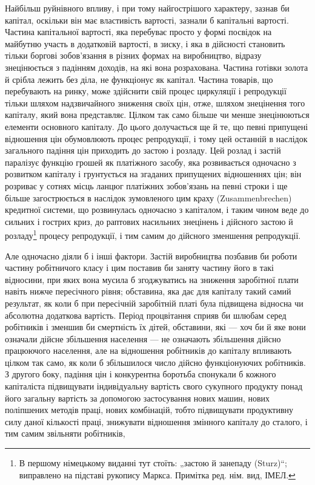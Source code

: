 Найбільш руйнівного впливу, і при тому найгострішого
характеру, зазнав би капітал, оскільки він має властивість
вартості, зазнали б капітальні вартості. Частина капітальної
вартості, яка перебуває просто у формі посвідок на майбутню
участь в додатковій вартості, в зиску, і яка в дійсності становить
тільки боргові зобов’язання в різних формах на виробництво,
відразу знецінюється з падінням доходів, на які вона розрахована.
Частина готівки золота й срібла лежить без діла, не функціонує
як капітал. Частина товарів, що перебувають на ринку, може
здійснити свій процес циркуляції і репродукції тільки шляхом
надзвичайного зниження своїх цін, отже, шляхом знецінення
того капіталу, який вона представляє. Цілком так само більше
чи менше знецінюються елементи основного капіталу. До цього
долучається ще й те, що певні припущені відношення цін
обумовлюють процес репродукції, і тому цей останній в наслідок
загального падіння цін приходить до застою і розладу. Цей
розлад і застій паралізує функцію грошей як платіжного засобу,
яка розвивається одночасно з розвитком капіталу і грунтується
на згаданих припущених відношеннях цін; він розриває у сотнях
місць ланцюг платіжних зобов’язань на певні строки і ще більше
загострюється в наслідок зумовленого цим краху (Zusammenbrechen)
кредитної системи, що розвинулась одночасно з капіталом,
і таким чином веде до сильних і гострих криз, до раптових
насильних знецінень і дійсного застою й розладу\footnote*{
В першому німецькому виданні тут стоїть: „застою й занепаду (Sturz)“;
виправлено на підставі рукопису Маркса. Примітка ред. нім. вид, ІМЕЛ.
} процесу
репродукції, і тим самим до дійсного зменшення репродукції.

Але одночасно діяли б і інші фактори. Застій виробництва
позбавив би роботи частину робітничого класу і цим поставив би
заняту частину його в такі відносини, при яких вона мусила б
згоджуватись на зниження заробітної плати навіть нижче пересічного
рівня; обставина, яка дає для капіталу такий самий результат,
як коли б при пересічній заробітній платі була підвищена
відносна чи абсолютна додаткова вартість. Період процвітання
сприяв би шлюбам серед робітників і зменшив би смертність їх
дітей, обставини, які — хоч би й яке вони означали дійсне збільшення
населення — не означають збільшення дійсно працюючого
населення, але на відношення робітників до капіталу впливають
цілком так само, як коли б збільшилося число дійсно функціонуючих
робітників. З другого боку, падіння цін і конкурентна
боротьба спонукали б кожного капіталіста підвищувати індивідуальну
вартість свого сукупного продукту понад його загальну
вартість за допомогою застосування нових машин, нових поліпшених
методів праці, нових комбінацій, тобто підвищувати продуктивну
силу даної кількості праці, знижувати відношення
змінного капіталу до сталого, і тим самим звільняти робітників,